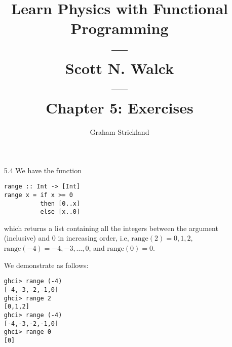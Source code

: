 \documentclass{article}
\title{
    Learn Physics with Functional Programming\\---\\Scott N. Walck\\---\\
    Chapter 5: Exercises
}
\author{Graham Strickland}
\begin{document}
\maketitle  

    \begin{itemize}
        \item[5.4] We have the function
        \begin{verbatim}
range :: Int -> [Int]
range x = if x >= 0
          then [0..x]
          else [x..0]
        \end{verbatim}
        which returns a list containing all the integers between the argument 
        (inclusive) and 0 in increasing order, i.e, $\text{range}(2) = 0, 1, 2$, 
        $\text{range}(-4) = -4, -3, \ldots, 0$, and $\text{range}(0) = 0$.\par
        \qquad We demonstrate as follows:
        \begin{verbatim}
ghci> range (-4)
[-4,-3,-2,-1,0]
ghci> range 2
[0,1,2]
ghci> range (-4)
[-4,-3,-2,-1,0]
ghci> range 0
[0]
        \end{verbatim}
    \end{itemize}
\end{document}
